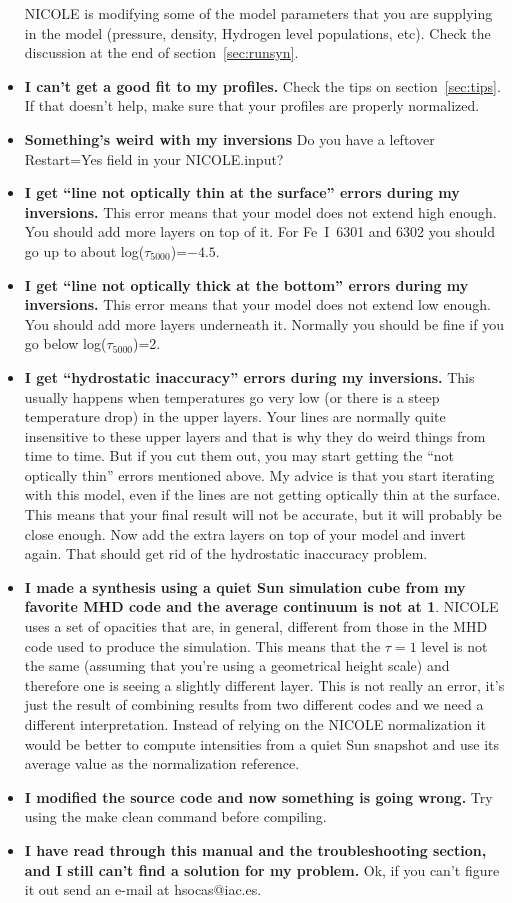 \begin{itemize}
  NICOLE is modifying some of the model parameters that you are
  supplying in the model (pressure, density, Hydrogen level
  populations, etc). Check the discussion at the end of section~\ref{sec:runsyn}. 
\item {\bf I can't get a good fit to my profiles.} Check the tips on
  section~\ref{sec:tips}. If that doesn't help, make sure that your
  profiles are properly normalized.
\item {\bf Something's weird with my inversions} Do you have a leftover
  Restart=Yes field in your NICOLE.input? 
\item {\bf I get ``line not optically thin at the surface'' errors
  during my inversions.}  This error means that your model does not
  extend high enough.  You should add more layers on top of it. For
  Fe~I~6301 and 6302 you should go up to about
  log($\tau_{5000}$)=$-4.5$.
\item {\bf I get ``line not optically thick at the bottom'' errors
  during my inversions.}  This error means that your model does not
  extend low enough. You should add more layers underneath it.
  Normally you should be fine if you go below log($\tau_{5000}$)=2.
\item {\bf I get ``hydrostatic inaccuracy'' errors during my
  inversions.}  This usually happens when temperatures go very low (or
  there is a steep temperature drop) in the upper layers.  Your lines
  are normally quite insensitive to these upper layers and that is why
  they do weird things from time to time.  But if you cut them out,
  you may start getting the ``not optically thin'' errors mentioned
  above. My advice is that you start iterating with this model, even
  if the lines are not getting optically thin at the surface. This
  means that your final result will not be accurate, but it will
  probably be close enough. Now add the extra layers on top of your
  model and invert again. That should get rid of the hydrostatic
  inaccuracy problem.
\item {\bf I made a synthesis using a quiet Sun simulation cube from
  my favorite MHD code and the average continuum is not at 1}. NICOLE
  uses a set of opacities that are, in general, different from those
  in the MHD code used to produce the simulation. This means that the
  $\tau=1$ level is not the same (assuming that you're using a
  geometrical height scale) and therefore one is seeing a slightly
  different layer. This is not really an error, it's just the result
  of combining results from two different codes and we need a different
  interpretation. Instead of relying on the NICOLE
  normalization it would be better to compute intensities from a quiet
  Sun snapshot and use its average value as the normalization reference.
\item {\bf I modified the source code and now something is going
  wrong.}  Try using the make clean command before compiling.
\item {\bf I have read through this manual and the troubleshooting
  section, and I still can't find a solution for my problem.} Ok, if
  you can't figure it out send an e-mail at hsocas@iac.es.
\end{itemize}

